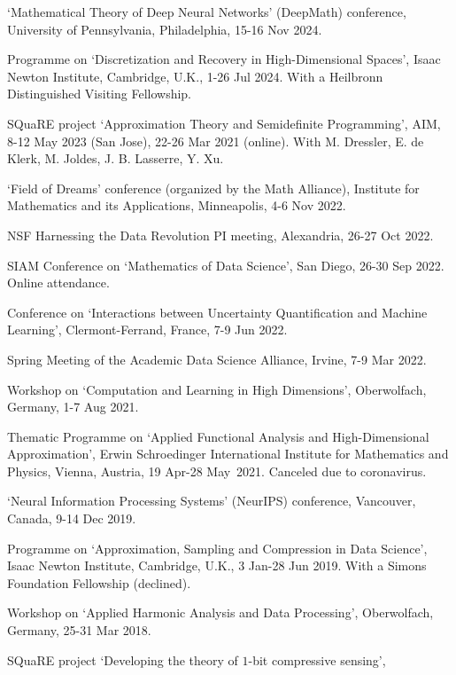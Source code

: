\documentclass[11pt]{article}
\begin{document}
\bitemize
\item `Mathematical Theory of Deep Neural Networks' (DeepMath) conference,
University of Pennsylvania,
Philadelphia, 15-16 Nov 2024.
\item Programme on `Discretization and Recovery in High-Dimensional Spaces',
Isaac Newton Institute, Cambridge, U.K., 1-26 Jul 2024.
With a Heilbronn Distinguished Visiting Fellowship.
\item SQuaRE project `Approximation Theory and Semidefinite Programming', AIM,  8-12 May 2023 (San Jose), 22-26 Mar 2021 (online). With M. Dressler, E. de Klerk, M. Joldes, J. B. Lasserre, Y. Xu.
\item `Field of Dreams' conference (organized by the Math Alliance),
Institute for Mathematics and its Applications, Minneapolis,  4-6 Nov 2022.
\item NSF Harnessing the Data Revolution PI meeting,
Alexandria,  26-27 Oct 2022.
\item SIAM Conference on `Mathematics of Data Science',
San Diego, 26-30 Sep 2022. Online attendance.
\item Conference on `Interactions between Uncertainty Quantification and Machine Learning',
Clermont-Ferrand, France, 7-9 Jun 2022.
\item Spring Meeting of the Academic Data Science Alliance, 
Irvine, 7-9 Mar 2022.
\item  Workshop on `Computation and Learning in High Dimensions', Oberwolfach, Germany, 1-7 Aug 2021.
\item Thematic Programme on `Applied Functional Analysis and High-Dimensional Approximation',
\mbox{Erwin} Schroedinger International Institute for Mathematics and Physics, Vienna, Austria, 
19 Apr-28 May~2021.
{\small Canceled due to coronavirus.}
\item `Neural Information Processing Systems' (NeurIPS) conference,
Vancouver, Canada, 9-14 Dec 2019.
\item Programme on `Approximation, Sampling and Compression in Data Science',
Isaac Newton Institute, Cambridge, U.K., 3 Jan-28 Jun 2019.
With a Simons Foundation Fellowship (declined).
\item  Workshop on `Applied Harmonic Analysis and Data Processing', Oberwolfach, Germany, 25-31 Mar 2018.
\item SQuaRE project `Developing the theory of $1$-bit compressive sensing',
\end{document}
